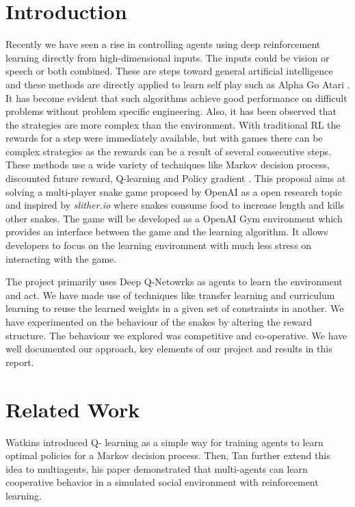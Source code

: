 \documentclass[conference,10pt]{IEEEtran}
\begin{document}
	\section{Introduction}
	Recently we have seen a rise in controlling agents using deep reinforcement learning directly from high-dimensional inputs. The inputs could be vision or speech or both combined. These are steps toward
	general artificial intelligence and these methods are directly applied to
	learn self play such as Alpha Go \cite{sp9} Atari \cite{sp3}. It has become
	evident that such algorithms achieve good performance on difficult problems
	without problem specific engineering. Also, it has been observed that the
	strategies are more complex than the environment. With traditional RL the
	rewards for a step were immediately available, but with games there can be
	complex strategies as the rewards can be a result of several consecutive steps.
	These methods use a wide variety of techniques like Markov decision process,
	discounted future reward, Q-learning \cite{sd5} and Policy gradient \cite{sd4}.\break
	This proposal aims at solving a multi-player snake game proposed by OpenAI as a open research topic and inspired by
	\textit{slither.io} \cite{sd2} where snakes consume food to increase length and
	kills other snakes. The game will be developed as a
	OpenAI Gym \cite{sd2} environment which provides an interface between the game
	and the learning algorithm. It allows developers to focus on the learning
	environment with much less stress on interacting with the game.
	
	
The project primarily uses Deep Q-Netowrks as agents to learn the environment and act. We have made use of techniques like transfer learning and curriculum learning to reuse the learned weights in a given set of constraints in another. We have experimented on the behaviour of the snakes by altering the reward structure. The behaviour we explored was competitive and co-operative. We have well documented our approach, key elements of our project and results in this report. 
	\section{Related Work}
	Watkins\cite{sp1} introduced Q- learning as a simple way for training agents to learn
	optimal policies for a Markov decision process. Then, Tan\cite{sp2} further extend
	this idea to multiagents, his paper demonstrated that
	multi-agents can learn cooperative behavior in a simulated social environment with reinforcement learning.
\end{document}
